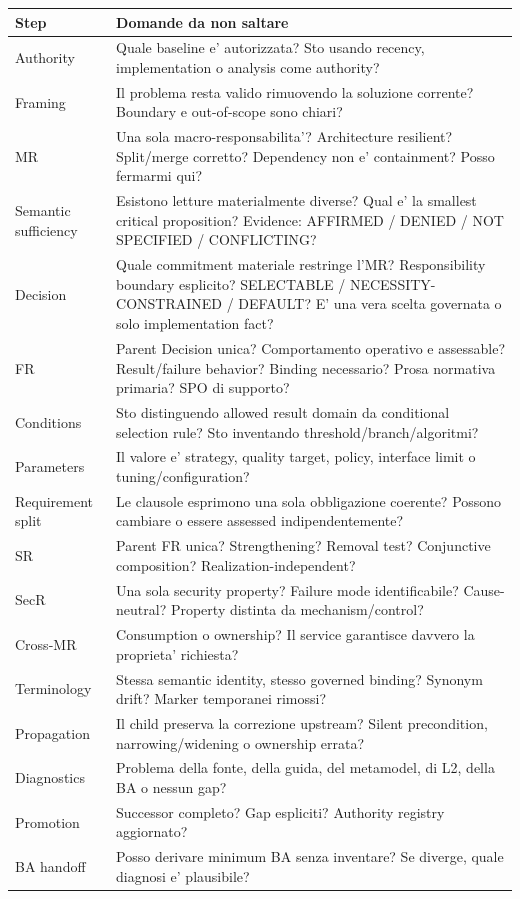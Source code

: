 \documentclass[11pt,a4paper]{article}
\begin{document}
\begin{longtable}{L{34mm}L{112mm}}
\toprule
\textbf{Step} & \textbf{Domande da non saltare} \\
\midrule
\endhead
Authority & Quale baseline e' autorizzata? Sto usando recency, implementation o analysis come authority? \\
Framing & Il problema resta valido rimuovendo la soluzione corrente? Boundary e out-of-scope sono chiari? \\
MR & Una sola macro-responsabilita'? Architecture resilient? Split/merge corretto? Dependency non e' containment? Posso fermarmi qui? \\
Semantic sufficiency & Esistono letture materialmente diverse? Qual e' la smallest critical proposition? Evidence: AFFIRMED / DENIED / NOT SPECIFIED / CONFLICTING? \\
Decision & Quale commitment materiale restringe l'MR? Responsibility boundary esplicito? SELECTABLE / NECESSITY-CONSTRAINED / DEFAULT? E' una vera scelta governata o solo implementation fact? \\
FR & Parent Decision unica? Comportamento operativo e assessable? Result/failure behavior? Binding necessario? Prosa normativa primaria? SPO di supporto? \\
Conditions & Sto distinguendo allowed result domain da conditional selection rule? Sto inventando threshold/branch/algoritmi? \\
Parameters & Il valore e' strategy, quality target, policy, interface limit o tuning/configuration? \\
Requirement split & Le clausole esprimono una sola obbligazione coerente? Possono cambiare o essere assessed indipendentemente? \\
SR & Parent FR unica? Strengthening? Removal test? Conjunctive composition? Realization-independent? \\
SecR & Una sola security property? Failure mode identificabile? Cause-neutral? Property distinta da mechanism/control? \\
Cross-MR & Consumption o ownership? Il service garantisce davvero la proprieta' richiesta? \\
Terminology & Stessa semantic identity, stesso governed binding? Synonym drift? Marker temporanei rimossi? \\
Propagation & Il child preserva la correzione upstream? Silent precondition, narrowing/widening o ownership errata? \\
Diagnostics & Problema della fonte, della guida, del metamodel, di L2, della BA o nessun gap? \\
Promotion & Successor completo? Gap espliciti? Authority registry aggiornato? \\
BA handoff & Posso derivare minimum BA senza inventare? Se diverge, quale diagnosi e' plausibile? \\
\bottomrule
\end{longtable}
\end{document}
